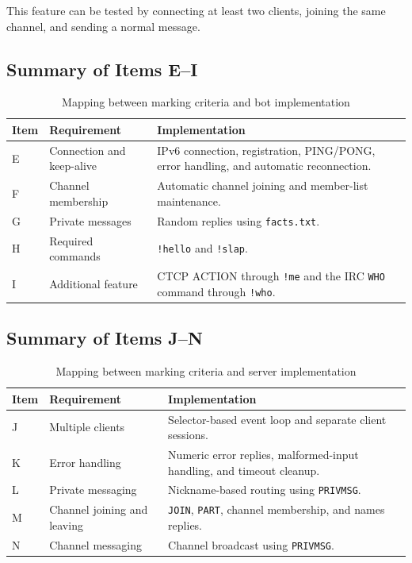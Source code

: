 \documentclass[a4paper,12pt]{article}
\begin{document}
This feature can be tested by connecting at least two clients, joining the same channel, and sending a normal message.


\clearpage

\subsection{Summary of Items E--I}

\begin{table}[H]
\centering
\small
\begin{tabular}{p{2cm}p{4cm}p{6cm}}
\toprule
Item & Requirement & Implementation \\
\midrule
E & Connection and keep-alive
& IPv6 connection, registration, PING/PONG, error handling, and automatic reconnection. \\

F & Channel membership
& Automatic channel joining and member-list maintenance. \\

G & Private messages
& Random replies using \texttt{facts.txt}. \\

H & Required commands
& \texttt{!hello} and \texttt{!slap}. \\

I & Additional feature
& CTCP ACTION through \texttt{!me} and the IRC \texttt{WHO} command through \texttt{!who}. \\

\bottomrule
\end{tabular}
\caption{Mapping between marking criteria and bot implementation}
\end{table}

\clearpage

\subsection{Summary of Items J--N}

\begin{table}[H]
\centering
\small
\begin{tabular}{p{2cm}p{4cm}p{6cm}}
\toprule
Item & Requirement & Implementation \\
\midrule
J & Multiple clients
& Selector-based event loop and separate client sessions. \\

K & Error handling
& Numeric error replies, malformed-input handling, and timeout cleanup. \\

L & Private messaging
& Nickname-based routing using \texttt{PRIVMSG}. \\

M & Channel joining and leaving
& \texttt{JOIN}, \texttt{PART}, channel membership, and names replies. \\

N & Channel messaging
& Channel broadcast using \texttt{PRIVMSG}. \\

\bottomrule
\end{tabular}
\caption{Mapping between marking criteria and server implementation}
\end{table}
\end{document}
